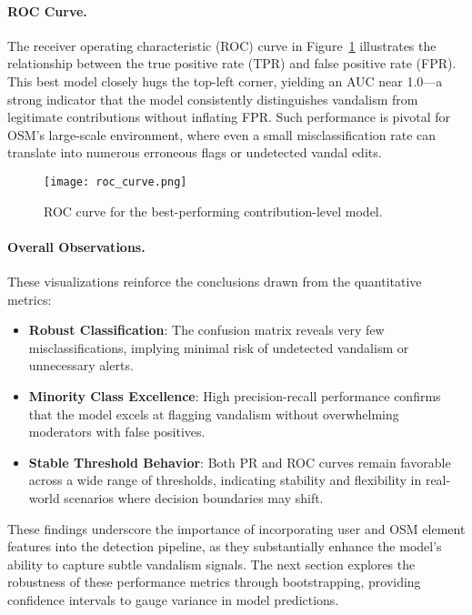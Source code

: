 \documentclass[
    13pt, %
    a4paper, %
    DIV14, %
    listof=totoc, %
    bibliography=totoc, %
    index=totoc, %
    headsepline
]{scrreprt}
\begin{document}
\paragraph{ROC Curve.}
The receiver operating characteristic (ROC) curve in Figure~\ref{fig:roc_curve} illustrates the relationship between the true positive rate (TPR) and false positive rate (FPR). This best model closely hugs the top-left corner, yielding an AUC near 1.0—a strong indicator that the model consistently distinguishes vandalism from legitimate contributions without inflating FPR. Such performance is pivotal for OSM’s large-scale environment, where even a small misclassification rate can translate into numerous erroneous flags or undetected vandal edits.

\begin{figure}[H]
    \centering
    \texttt{[image: roc\_curve.png]}
    \caption{ROC curve for the best-performing contribution-level model.}
    \label{fig:roc_curve}
\end{figure}

\paragraph{Overall Observations.}
These visualizations reinforce the conclusions drawn from the quantitative metrics:
\begin{itemize}
    \item \textbf{Robust Classification}: The confusion matrix reveals very few misclassifications, implying minimal risk of undetected vandalism or unnecessary alerts.
    \item \textbf{Minority Class Excellence}: High precision-recall performance confirms that the model excels at flagging vandalism without overwhelming moderators with false positives.
    \item \textbf{Stable Threshold Behavior}: Both PR and ROC curves remain favorable across a wide range of thresholds, indicating stability and flexibility in real-world scenarios where decision boundaries may shift.
\end{itemize}

These findings underscore the importance of incorporating user and OSM element features into the detection pipeline, as they substantially enhance the model’s ability to capture subtle vandalism signals. The next section explores the robustness of these performance metrics through bootstrapping, providing confidence intervals to gauge variance in model predictions.
\end{document}

